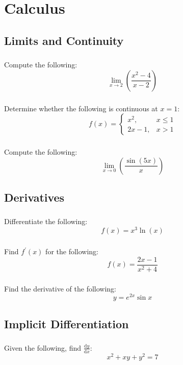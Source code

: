 \documentclass[12pt]{article}
\newcommand{\dd}{\text{d}}
\begin{document}
	\section{Calculus}
		\subsection{Limits and Continuity}
			\subsubsection{}
				Compute the following:
				\[\lim_{x\to2}\left(\frac{x^2-4}{x-2}\right)\]
			\subsubsection{}
				Determine whether the following is continuous at \(x=1\):
				\[f(x)=\begin{cases}x^2,&x\le 1\\2x-1,&x>1\end{cases}\]
			\subsubsection{}
				Compute the following:
				\[\lim_{x\to0}\left(\frac{\sin(5x)}{x}\right)\]

		\subsection{Derivatives}
			\subsubsection{}
				Differentiate the following:
				\[f(x)=x^3\ln\left(x\right)\]
			\subsubsection{}
				Find \(f^\prime(x)\) for the following:
				\[f(x)=\frac{2x-1}{x^2+4}\]
			\subsubsection{}
				Find the derivative of the following:
				\[y=e^{2x}\sin x\]

		\subsection{Implicit Differentiation}
			\subsubsection{}
				Given the following, find \(\frac{\dd y}{\dd x}\):
				\[x^2+xy+y^2=7\]
\end{document}
